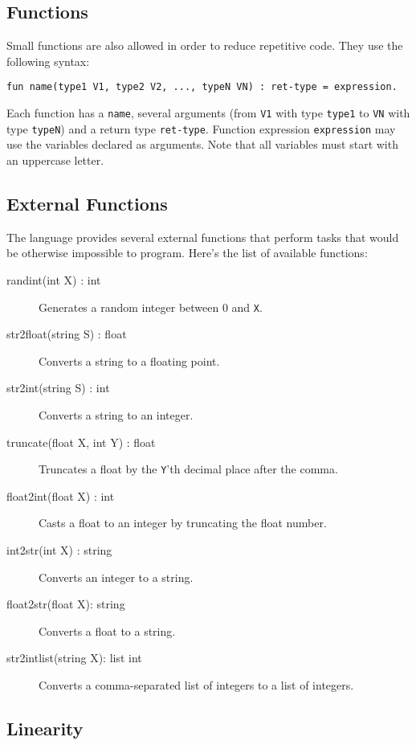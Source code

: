 \documentclass[11pt]{article}
\begin{document}
\subsection{Functions}

Small functions are also allowed in order to reduce repetitive code. They use the following syntax:

\begin{verbatim}
fun name(type1 V1, type2 V2, ..., typeN VN) : ret-type = expression.
\end{verbatim}

Each function has a \texttt{name}, several arguments (from \texttt{V1} with type \texttt{type1} to \texttt{VN} with type \texttt{typeN})
and a return type \texttt{ret-type}. Function expression \texttt{expression} may use the variables declared as arguments.
Note that all variables must start with an uppercase letter.

\subsection{External Functions}

The language provides several external functions that perform tasks that would be otherwise impossible to program. Here's the list of available functions:

\begin{description}
\item[randint(int X) : int] Generates a random integer between 0 and \texttt{X}.
\item[str2float(string S) : float] Converts a string to a floating point.
\item[str2int(string S) : int] Converts a string to an integer.
\item[truncate(float X, int Y) : float] Truncates a float by the \texttt{Y}'th decimal place after the comma.
\item[float2int(float X) : int] Casts a float to an integer by truncating the float number.
\item[int2str(int X) : string] Converts an integer to a string.
\item[float2str(float X): string] Converts a float to a string.
\item[str2intlist(string X): list int] Converts a comma-separated list of integers to a list of integers.
\end{description}

\subsection{Linearity}
\end{document}
